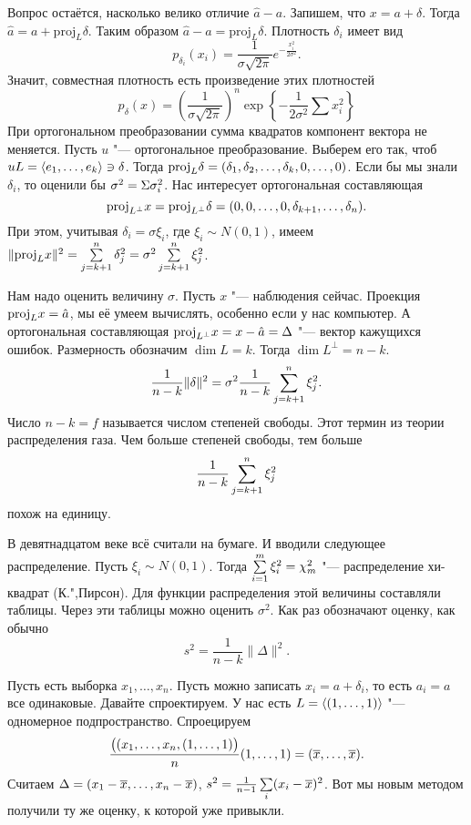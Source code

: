 Вопрос остаётся, насколько велико отличие $\hat a - a$. Запишем, что $x = a+ \delta$. Тогда $\hat a = a + \mathrm{proj}_L \delta$. Таким образом $\hat a - a = \mathrm{proj}_L\delta$. Плотность $\delta_i$ имеет вид
\[
  p_{\delta_i}(x_i) = \frac{1}{\sigma\sqrt{2\pi}}e^{-\frac{x_i^2}{2\sigma^2}}.
\]
Значит, совместная плотность есть произведение этих плотностей
\[
  p_\delta(x) = \left( \frac{1}{\sigma\sqrt{2\pi}} \right)^n\exp\left\{ -\frac{1}{2\sigma^2}\sum x_i^2 \right\}
\]
При ортогональном преобразовании сумма квадратов компонент вектора не меняется. Пусть $u$ "--- ортогональное преобразование. Выберем его так, чтоб $uL = \langle e_1,\dots, e_k\rangle\ni \delta$. Тогда $\mathrm{proj}_{L}\delta = (\delta_1,\delta_2,\dots,\delta_k,0,\dots,0)$.  Если бы мы знали $\delta_i$, то оценили бы $\sigma^2 = \Sigma \sigma_i^2$. Нас интересует ортогональная составляющая
\[
  \mathrm{proj}_{L^\perp} x = \mathrm{proj}_{L^\perp} \delta = (0,0,\dots,0,\delta_{k+1},\dots, \delta_n).
\]
При этом, учитывая $\delta_i =\sigma\xi_i$, где $\xi_i\sim N(0,1)$, имеем  $\|\mathrm{proj}_L x\|^2 = \sum\limits_{j = k+1}^{n} \delta_j^2 = \sigma^2\sum\limits_{j = k+1}^{n}\xi_j^2$.

Нам надо оценить величину $\sigma$. Пусть $x$ "--- наблюдения сейчас. Проекция $\mathrm{proj}_L x = \hat a$, мы её умеем вычислять, особенно если у нас компьютер. А ортогональная составляющая $\mathrm{proj}_{L^\perp} x = x - \hat a = \Delta$ "--- вектор кажущихся ошибок.
Размерность обозначим $\dim L = k$. Тогда $\dim L^\perp = n-k$.
\[
  \frac1{n-k}\|\delta\|^2 = \sigma^2 \frac1{n-k}\sum\limits_{j = k+1}^{n}\xi_j^2.
\]
Число $n-k=f$ называется числом степеней свободы. Этот термин из теории распределения газа. Чем больше степеней свободы, тем больше
\[
  \frac1{n-k} \sum\limits_{j = k+1}^{n}\xi_j^2
\]
похож на единицу.

В девятнадцатом веке всё считали на бумаге. И вводили следующее распределение. Пусть $\xi_i\sim N(0,1)$. Тогда $\sum\limits_{i = 1}^{m} \xi_i^2 = \chi_m^2$ "--- распределение хи-квадрат (К.",Пирсон).
Для функции распределения этой величины составляли таблицы. Через эти таблицы можно оценить $\sigma^2$. Как раз обозначают оценку, как обычно
\[
  s^2 = \frac1{n-k} \|\Delta\|^2.
\]

Пусть есть выборка $x_1,\dots,x_n$. Пусть можно записать $x_i = a+\delta_i$, то есть $a_i = a$ все одинаковые. Давайте спроектируем. У нас есть $L = \langle (1,\dots,1)\rangle$ "--- одномерное подпространство. Спроецируем
\[
  \frac{\big((x_1,\dots,x_n,(1,\dots,1)\big)}{n}(1,\dots,1) = (\overline{x},\dots,\overline{x}).
\]
Считаем $\Delta = (x_1 - \overline{x},\dots,x_n-\overline{x})$, $s^2 = \frac1{n-1}\sum\limits_i(x_i-\overline{x})^2$. Вот мы новым методом получили ту же оценку, к которой уже привыкли.
